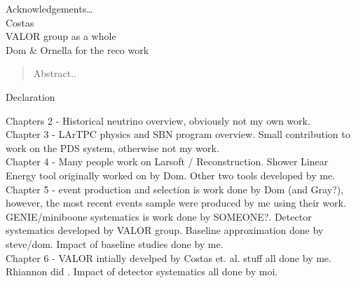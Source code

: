 


\begin{acknowledgements}
  Acknowledgements\dots \\
  Costas \\
  VALOR group as a whole \\
  Dom \& Ornella for the reco work
\end{acknowledgements}

\begin{abstract}%
  Abstract..
\end{abstract}


\begin{declaration}
  Declaration
  \vspace*{1cm}
  
  Chapters 2 - Historical neutrino overview, obviously not my own work. \\
  Chapter 3 - LArTPC physics and SBN program overview. Small contribution to work on the PDS system, otherwise not my work. \\
  Chapter 4 - Many people work on Larsoft / Reconstruction. Shower Linear Energy tool originally worked on by Dom. Other two tools developed by me. \\
  Chapter 5 - \nue event production and selection is work done by Dom (and Gray?), however, the most recent events sample were produced by me using their work. GENIE/miniboone systematics is work done by SOMEONE?. Detector systematics developed by VALOR group. Baseline approximation done by steve/dom. Impact of baseline studies done by me. \\
  Chapter 6 - VALOR intially develped by Costas et. al. \nue stuff all done by me. Rhiannon did \numu. Impact of detector systematics all done by moi. 
  
\end{declaration}





